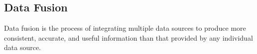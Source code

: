 \subsection{Data Fusion}
Data fusion is the process of integrating multiple data sources to produce more consistent, accurate, and useful information than that provided by any individual data source.
 \cite{hsu2005comparing}
 \cite{wu2006performance}
